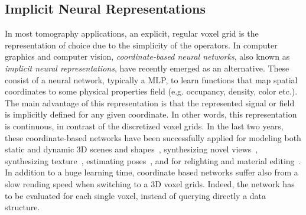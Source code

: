 \documentclass[acmtog,nonacm]{acmart} \acmSubmissionID{0438}
\begin{document}
\subsection{Implicit Neural Representations}
In most tomography applications, an explicit, regular voxel grid is
the representation of choice due to the simplicity of the operators.
In computer graphics and computer vision, {\em coordinate-based neural
networks}, also known as {\em implicit neural representations}, have
recently emerged as an alternative.
These consist of a neural network, typically a MLP, to learn functions 
that map spatial coordinates to some physical properties field (e.g. 
occupancy, density, color etc.). The main advantage of this 
representation is that the represented signal
or field is implicitly defined for any given coordinate. In other
words, this representation is continuous, in contrast of the
discretized voxel grids. In the last two years, these coordinate-based
networks have been successfully applied for modeling both static and
dynamic 3D scenes and shapes~\cite{park2019deepsdf,
  sitzmann2020implicit, martin2021nerf, du2021neural, xian2021space},
synthesizing novel views~\cite{eslami2018neural, sitzmann2019scene,
  mildenhall2020nerf, niemeyer2020differentiable, schwarz2020graf,
  chan2021pi}, synthesizing texture~\cite{oechsle2019texture,
  saito2019pifu, chibane2020implicit}, estimating
poses~\cite{yen2020inerf, su2021nerf, wang2021nerf}, and for
relighting and material editing~\cite{boss2021nerd,
  srinivasan2021nerv, xiang2021neutex, zhang2021physg}. In addition to
a huge learning time, coordinate based networks suffer also from a
slow rending speed when switching to a 3D voxel grids. Indeed, the
network has to be evaluated for each single voxel, instead of querying
directly a data structure.
\end{document}
